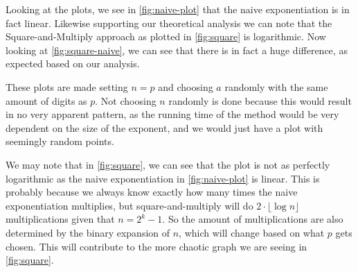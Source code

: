 Looking at the plots, we see in \autoref{fig:naive-plot} that the naive exponentiation is in fact linear.
Likewise supporting our theoretical analysis we can note that the Square-and-Multiply approach as plotted in \autoref{fig:square} is logarithmic.
Now looking at \autoref{fig:square-naive}, we can see that there is in fact a huge difference, as expected based on our analysis.

These plots are made setting $n=p$ and choosing $a$ randomly with the same amount of digits as $p$.
Not choosing $n$ randomly is done because this would result in no very apparent pattern, as the running time of the method would be very dependent on the size of the exponent, and we would just have a plot with seemingly random points.

We may note that in \autoref{fig:square}, we can see that the plot is not as perfectly logarithmic as the naive exponentiation in \autoref{fig:naive-plot} is linear.
This is probably because we always know exactly how many times the naive exponentiation multiplies, but square-and-multiply will do $2\cdot \lfloor \log n \rfloor$ multiplications given that $n=2^k-1$.
So the amount of multiplications are also determined by the binary expansion of $n$, which will change based on what $p$ gets chosen.
This will contribute to the more chaotic graph we are seeing in \autoref{fig:square}.


